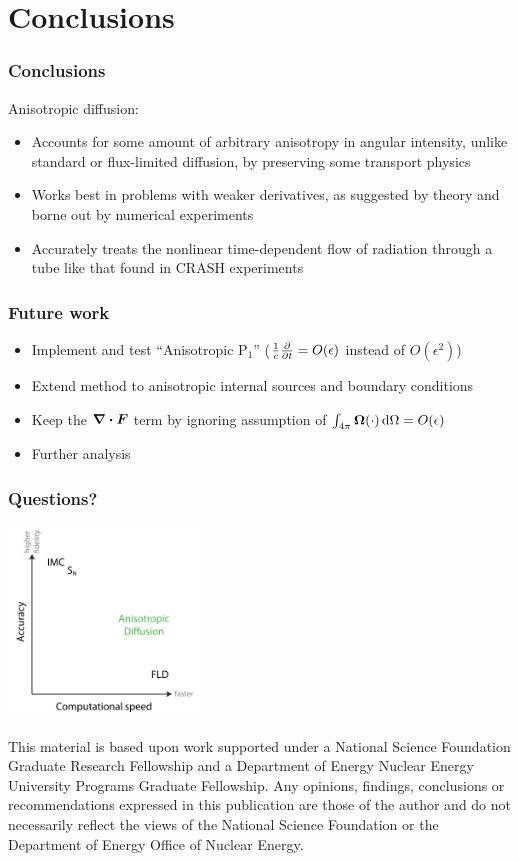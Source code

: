 \documentclass{beamer}
\begin{document}
\section{Conclusions}
\begin{frame}
  \frametitle{Conclusions}
  Anisotropic diffusion:
  \begin{itemize}
    \item Accounts for some amount of arbitrary anisotropy in
      angular intensity, unlike standard or flux-limited diffusion, by
      preserving some transport physics
    \item Works best in problems with weaker derivatives, as suggested by
      theory and borne out by numerical experiments
    \item Accurately treats the nonlinear time-dependent flow of radiation
      through a tube like that found in CRASH experiments
  \end{itemize}
\end{frame}
\begin{frame}
  \frametitle{Future work}
  \begin{itemize}
    \item Implement and test ``Anisotropic P$_1$''
      ($\frac1c\frac{\partial }{\partial t}=O(\epsilon)$ instead of $O(\epsilon^2)$)
    \item Extend method to anisotropic internal sources and boundary conditions
    \item Keep the $\bm{\nabla} \bm{\cdot} \bm{F}$ term by ignoring assumption of
      $\int_{4\pi} \bm{\Omega} (\cdot) \mathop{}\!\mathrm{d} \Omega = O(\epsilon)$ 
    \item Further analysis 
  \end{itemize}
\end{frame}
\appendix
\begin{frame}
  \frametitle{Questions?}
  \begin{center}
    \includegraphics[width=2in]{../figures/fidelity2}
  \end{center}
{\setlength{\baselineskip}{-\baselineskip} \tiny 
This material is based upon work supported under a National Science Foundation
Graduate Research Fellowship and a Department of Energy Nuclear Energy
University Programs Graduate Fellowship. Any opinions, findings, conclusions or
recommendations expressed in this publication are those of the author and do
not necessarily reflect the views of the National Science Foundation or the
Department of Energy Office of Nuclear Energy.\par}
\end{frame}
\end{document}
